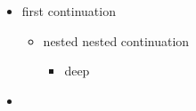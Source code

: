 \begin{itemize}
\item<1->[A] first
continuation
\begin{itemize}
\item nested
nested continuation
\begin{itemize}
\item deep
\end{itemize}
\end{itemize}
\item
\end{itemize}
